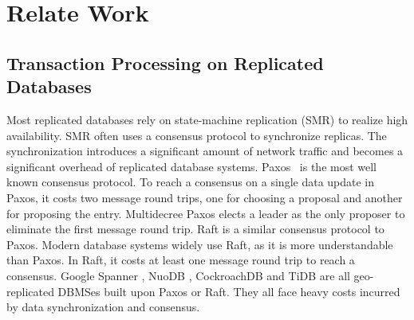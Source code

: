 \documentclass[conference]{IEEEtran}
\begin{document}
\section{Relate Work}
\label{sec:relate_work}

\subsection{Transaction Processing on Replicated Databases}


Most replicated databases rely on state-machine replication (SMR) to realize high availability.
SMR often uses a consensus protocol to synchronize replicas.
The synchronization introduces a significant amount of network traffic and becomes a significant overhead of replicated database systems.
Paxos~\cite{Paxos:journals/tocs/Lamport98}\cite{PaxosSimple:conf/opodis/Lamport02} is the most well known consensus protocol.
To reach a consensus on a single data update in Paxos, it costs two message round trips, one for choosing a proposal and another for proposing the entry.
Multidecree Paxos\cite{Multidecree:journals/csur/RenesseA15} elects a leader as the only proposer to eliminate the first message round trip.
Raft\cite{Raft:conf/usenix/OngaroO14} is a similar consensus protocol to Paxos.
Modern database systems widely use Raft, as it is more understandable than Paxos.
In Raft, it costs at least one message round trip to reach a consensus.
Google Spanner \cite{Spanner:conf/osdi/CorbettDEFFFGGHHHKKLLMMNQRRSSTWW12}\cite{Spanner:conf/sigmod/BaconBBCDFFGJKL17},
NuoDB \cite{NuoDB}, CockroachDB \cite{CockroachDB} and TiDB \cite{TiDB} are all geo-replicated DBMSes built upon Paxos or Raft.
They all face heavy costs incurred by data synchronization and consensus.
\end{document}
